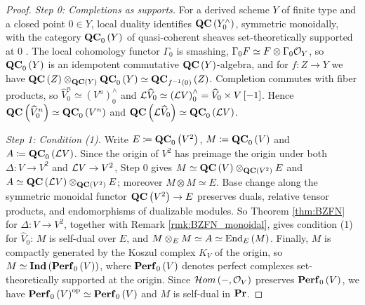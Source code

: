 \begin{proof}
\emph{Step 0: Completions as supports.}
For a derived scheme $Y$ of finite type and a closed point $0\in Y$, local duality identifies
$\mathbf{QC}\left(Y^\wedge_0\right)$, symmetric monoidally, with the category $\mathbf{QC}_0\left(Y\right)$ of
quasi-coherent sheaves set-theoretically supported at $0$
\cite[Chapters 7--8]{L:SAG}. The local cohomology functor $\Gamma_0$ is
smashing, $\Gamma_0 F\simeq F\otimes\Gamma_0\mathcal{O}_Y$, so $\mathbf{QC}_0\left(Y\right)$ is an idempotent
commutative $\mathbf{QC}\left(Y\right)$-algebra, and for $f\colon Z\to Y$ we have
$\mathbf{QC}\left(Z\right)\otimes_{\mathbf{QC}\left(Y\right)}\mathbf{QC}_0\left(Y\right)\simeq\mathbf{QC}_{f^{-1}\left(0\right)}\left(Z\right)$.
Completion commutes with fiber products, so $\widehat V_0^n\simeq\left(V^n\right)^\wedge_0$ and
$\mathcal{L}\widehat V_0\simeq\left(\mathcal{L} V\right)^\wedge_0=\widehat V_0\times V\left[-1\right]$.
Hence $\mathbf{QC}\left(\widehat V_0^n\right)\simeq\mathbf{QC}_0\left(V^n\right)$ and
$\mathbf{QC}\left(\mathcal{L}\widehat V_0\right)\simeq\mathbf{QC}_0\left(\mathcal{L} V\right)$.

\emph{Step 1: Condition (1).}
Write $E\coloneqq\mathbf{QC}_0\left(V^2\right)$, $M\coloneqq\mathbf{QC}_0\left(V\right)$ and
$A\coloneqq\mathbf{QC}_0\left(\mathcal{L} V\right)$. Since the origin of $V^2$ has preimage the origin under both
$\Delta\colon V\to V^2$ and $\mathcal{L} V\to V^2$, Step 0 gives
$M\simeq\mathbf{QC}\left(V\right)\otimes_{\mathbf{QC}\left(V^2\right)}E$ and
$A\simeq\mathbf{QC}\left(\mathcal{L} V\right)\otimes_{\mathbf{QC}\left(V^2\right)}E$; moreover $M\otimes M\simeq E$.
Base change along the symmetric monoidal functor $\mathbf{QC}\left(V^2\right)\to E$ preserves duals,
relative tensor products, and endomorphisms of dualizable modules. So Theorem
\ref{thm:BZFN} for $\Delta\colon V\to V^2$, together with Remark \ref{rmk:BZFN_monoidal},
gives condition (1) for $\widehat V_0$: $M$ is self-dual over $E$, and
$M\otimes_E M\simeq A\simeq\operatorname{End}_E\left(M\right)$. Finally, $M$ is compactly generated by the
Koszul complex $K_V$ of the origin, so $M\simeq\mathbf{Ind}\left(\mathbf{Perf}_0\left(V\right)\right)$, where
$\mathbf{Perf}_0\left(V\right)$ denotes perfect complexes set-theoretically supported at the origin.
Since $\mathcal{H}om\left(-,\mathcal{O}_V\right)$ preserves $\mathbf{Perf}_0\left(V\right)$, we have
$\mathbf{Perf}_0\left(V\right)^{\text{op}}\simeq\mathbf{Perf}_0\left(V\right)$ and $M$ is self-dual in $\mathbf{Pr}$.


\end{proof}
